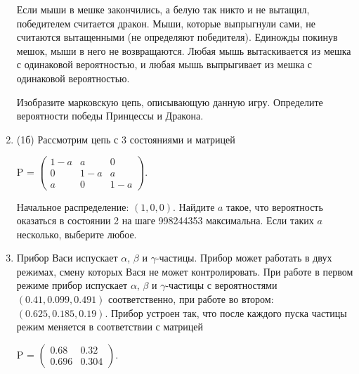 \documentclass[a4paper, 14pt]{extarticle}
\begin{document}
\begin{enumerate}
Если мыши в мешке закончились, а белую так никто и не вытащил, победителем считается дракон. Мыши, которые выпрыгнули сами, не считаются вытащенными (не определяют победителя). Единожды покинув мешок, мыши в него не возвращаются. Любая мышь вытаскивается из мешка с одинаковой вероятностью, и любая мышь выпрыгивает из мешка с одинаковой вероятностью.

Изобразите марковскую цепь, описывающую данную игру. Определите вероятности победы Принцессы и Дракона.

\item (1б) Рассмотрим цепь с 3 состояниями и матрицей

\begin{center}
    P = $\left ( \begin{array}{ccc}
        1 - a & a & 0 \\
        0 & 1 - a & a \\
        a & 0 & 1 - a
    \end{array} \right ).$
\end{center}

Начальное распределение: $\left ( 1, 0, 0 \right )$. Найдите $a$ такое, что вероятность оказаться в состоянии 2 на шаге 998244353 максимальна. Если таких $a$ несколько, выберите любое.

\item Прибор Васи испускает $\alpha$, $\beta$ и $\gamma$-частицы. Прибор может работать в двух режимах, смену которых Вася не может контролировать. При работе в первом режиме прибор испускает $\alpha$, $\beta$ и $\gamma$-частицы с вероятностями $\left ( 0.41, 0.099, 0.491 \right )$ соответственно, при работе во втором: $\left ( 0.625, 0.185, 0.19 \right )$. Прибор устроен так, что после каждого пуска частицы режим меняется в соответствии с матрицей

\begin{center}
    P = $\left ( \begin{array}{cc}
        0.68 & 0.32 \\
        0.696 & 0.304
    \end{array} \right ).$
\end{center}


\end{enumerate}
\end{document}
